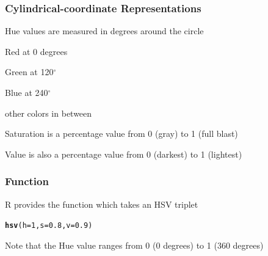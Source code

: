 \documentclass[12pt]{beamer}\usepackage[]{graphicx}\usepackage[]{color}
\makeatletter
\newcommand{\hlnum}[1]{\textcolor[rgb]{0.686,0.059,0.569}{#1}}%
\newcommand{\hlstd}[1]{\textcolor[rgb]{0.345,0.345,0.345}{#1}}%
\newcommand{\hlkwc}[1]{\textcolor[rgb]{0.333,0.667,0.333}{#1}}%
\newcommand{\hlkwd}[1]{\textcolor[rgb]{0.737,0.353,0.396}{\textbf{#1}}}%
\newenvironment{kframe}{%
 \def\at@end@of@kframe{}%
 \ifinner\ifhmode%
  \def\at@end@of@kframe{\end{minipage}}%
  \begin{minipage}{\columnwidth}%
 \fi\fi%
 \def\FrameCommand##1{\hskip\@totalleftmargin \hskip-\fboxsep
 \colorbox{shadecolor}{##1}\hskip-\fboxsep
     \hskip-\linewidth \hskip-\@totalleftmargin \hskip\columnwidth}%
 \MakeFramed {\advance\hsize-\width
   \@totalleftmargin\z@ \linewidth\hsize
   \@setminipage}}%
 {\par\unskip\endMakeFramed%
 \at@end@of@kframe}
\newenvironment{knitrout}{}{} %
\makeatother
\begin{document}

\begin{frame}
\frametitle{Cylindrical-coordinate Representations}

 \bi
  \item Hue values are measured in degrees around the circle
  \bi
    \item Red at 0 degrees
    \item Green at 120$^\circ$
    \item Blue at 240$^\circ$
    \item other colors in between
  \ei
  \item Saturation is a percentage value from 0 (gray) to 1 (full blast)
  \item Value is also a percentage value from 0 (darkest) to 1 (lightest)
 \ei
\eb

\end{frame}


\begin{frame}
\frametitle{Function }

R provides the function {\hilit {}} which takes an
HSV triplet
\begin{knitrout}\footnotesize
{}\color{fgcolor}\begin{kframe}
\begin{alltt}
\hlkwd{hsv}\hlstd{(}\hlkwc{h} \hlstd{=} \hlnum{1}\hlstd{,} \hlkwc{s} \hlstd{=} \hlnum{0.8}\hlstd{,} \hlkwc{v} \hlstd{=} \hlnum{0.9}\hlstd{)}
\end{alltt}
\end{kframe}
\end{knitrout}

\bigskip

Note that the Hue value ranges from 0 (0 degrees) to 1 (360 degrees)

\end{frame}

\end{document}
